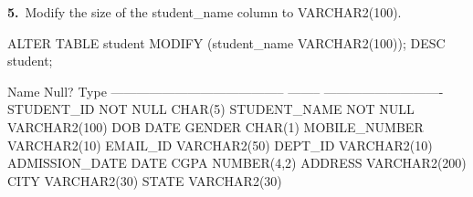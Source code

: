 
\noindent\begin{minipage}{\linewidth}
\begingroup{}
{\fontsize{14}{17}\selectfont\textbf{5.}}\ Modify the size of the student\_name column to VARCHAR2(100).\par
\endgroup\vspace{12pt}


\begin{sqlcode}
ALTER TABLE student MODIFY (student_name VARCHAR2(100));
DESC student;
\end{sqlcode}

\vspace{18pt}


\begin{sqlout}
 Name                                      Null?    Type
 ----------------------------------------- -------- ----------------------------
 STUDENT_ID                                NOT NULL CHAR(5)
 STUDENT_NAME                              NOT NULL VARCHAR2(100)
 DOB                                                DATE
 GENDER                                             CHAR(1)
 MOBILE_NUMBER                                      VARCHAR2(10)
 EMAIL_ID                                           VARCHAR2(50)
 DEPT_ID                                            VARCHAR2(10)
 ADMISSION_DATE                                     DATE
 CGPA                                               NUMBER(4,2)
 ADDRESS                                            VARCHAR2(200)
 CITY                                               VARCHAR2(30)
 STATE                                              VARCHAR2(30)
\end{sqlout}
\end{minipage}\par\vspace{30pt}

